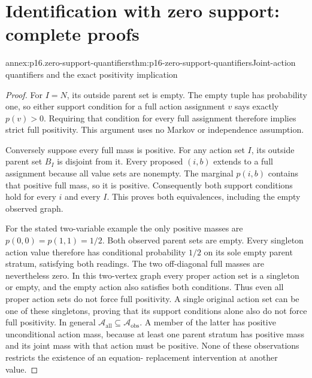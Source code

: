 \section{Identification with zero support: complete proofs}
\label{sec:annex-p16-identification-with-zero-support}

\begin{annexitem}{annex:p16.zero-support-quantifiers}{thm:p16-zero-support-quantifiers}{Joint-action quantifiers and the exact positivity implication}
\begin{proof}
For \(I=N\), its outside parent set is empty. The empty tuple
has probability one, so either support condition for a full action
assignment \(v\) says exactly \(p(v)>0\). Requiring that
condition for every full assignment therefore implies strict full
positivity. This argument uses no Markov or independence assumption.

Conversely suppose every full mass is positive. For any action set
\(I\), its outside parent set \(B_I\) is disjoint from it.
Every proposed \((i,b)\) extends to a full assignment because
all value sets are nonempty. The marginal \(p(i,b)\) contains
that positive full mass, so it is positive. Consequently both support
conditions hold for every \(i\) and every \(I\). This proves
both equivalences, including the empty observed graph.

For the stated two-variable example the only positive masses are
\(p(0,0)=p(1,1)=1/2\). Both observed parent sets are empty.
Every singleton action value therefore has conditional probability
\(1/2\) on its sole empty parent stratum, satisfying both readings.
The two off-diagonal full masses are nevertheless zero. In this
two-vertex graph every proper action set is a singleton or empty,
and the empty action also satisfies both conditions. Thus even all
proper action sets do not force full positivity. A single
original action set can be one of these singletons, proving that
its support conditions alone also do not force full positivity.
In general \(\mathcal A_{\mathrm{all}}\subseteq
\mathcal A_{\mathrm{obs}}\). A member of the latter has positive
unconditional action mass, because at least one parent stratum has
positive mass and its joint mass with that action must be positive.
None of these observations restricts the existence of an equation-
replacement intervention at another value.
\end{proof}
\end{annexitem}

